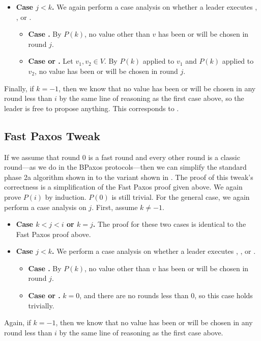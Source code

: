 \begin{itemize}
  \item \textbf{Case $j < k$.}
    We again perform a case analysis on whether a leader executes
    , , or
    .
    \begin{itemize}
      \item \textbf{Case .}
        By $P(k)$, no value other than $v$ has been or will be chosen in round
        $j$.
      \item \textbf{Case  or
                         .}
        Let $v_1, v_2 \in V$. By $P(k)$ applied to $v_1$ and $P(k)$ applied to
        $v_2$, no value has been or will be chosen in round $j$.
    \end{itemize}
\end{itemize}

Finally, if $k = -1$, then we know that no value has been or will be chosen in
any round less than $i$ by the same line of reasoning as the first case above,
so the leader is free to propose anything. This corresponds to
.

\subsection{Fast Paxos Tweak}
If we assume that round $0$ is a fast round and every other round is a classic
round---as we do in the BPaxos protocols---then we can simplify the standard
phase 2a algorithm shown in  to the variant shown in
.
%
The proof of this tweak's correctness is a simplification of the Fast Paxos
proof given above. We again prove $P(i)$ by induction. $P(0)$ is still trivial.
For the general case, we again perform a case analysis on $j$. First, assume $k
\neq -1$.  \begin{itemize}
  \item \textbf{Case $k < j < i$ or $k = j$.}
    The proof for these two cases is identical to the Fast Paxos proof above.

  \item \textbf{Case $j < k$.}
    We perform a case analysis on whether a leader executes
    , , or
    .
    \begin{itemize}
      \item \textbf{Case .}
        By $P(k)$, no value other than $v$ has been or will be chosen in round
        $j$.
      \item \textbf{Case  or
                         .}
        $k = 0$, and there are no rounds less than $0$, so this case
        holds trivially.
    \end{itemize}
\end{itemize}

Again, if $k = -1$, then we know that no value has been or will be chosen in
any round less than $i$ by the same line of reasoning as the first case above.
